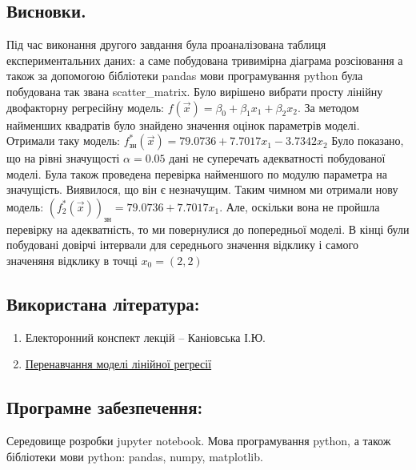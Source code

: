 \documentclass[a5paper, 20pt]{article}
\begin{document}
\subsection{Висновки.}

Під час виконання другого завдання була проаналізована таблиця експериментальних даних: а саме побудована тривимірна діаграма розсіювання а також за допомогою бібліотеки pandas мови програмування python була побудована так звана scatter\_matrix. Було вирішено вибрати просту лінійну двофакторну регресійну модель: $f(\vec{x}) = \beta_0 + \beta_1 x_1 + \beta_2 x_2$. За методом найменших квадратів було знайдено значення оцінок параметрів моделі. Отримали таку модель: $ f_{\text{зн}}^*(\vec{x}) = 79.0736 + 7.7017x_1 -3.7342 x_2$ Було показано, що на рівні значущості $\alpha = 0.05$ дані не суперечать адекватності побудованої моделі. Була також проведена  перевірка найменшого по модулю параметра на значущість. Виявилося, що він є незначущим. Таким чимном ми отримали нову модель: $ \left(f_2^*(\vec{x})\right)_{\text{зн}} = 79.0736 + 7.7017x_1$. Але, оскільки вона не пройшла перевірку на адекватність, то ми повернулися до попередньої моделі. В кінці були побудовані довірчі інтервали для середнього значення відклику і самого значеняня відклику в точці $x_0 = (2, 2)$

\subsection*{Використана література:}

\begin{enumerate}
\item Електоронний конспект лекцій -- Каніовська І.Ю.
\item \href{https://neerc.ifmo.ru/wiki/index.php?title=\%D0\%9F\%D0\%B5\%D1\%80\%D0\%B5\%D0\%BE\%D0\%B1\%D1\%83\%D1\%87\%D0\%B5\%D0\%BD\%D0\%B8\%D0\%B5}{Перенавчання моделі лінійної регресії}
\end{enumerate}

\subsection*{Програмне забезпечення:}

Середовище розробки jupyter notebook. Мова програмування python, а також бібліотеки мови python: pandas, numpy, matplotlib.  
\end{document}
